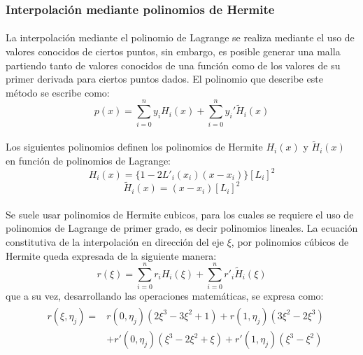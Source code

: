 \documentclass[letterpaper, openright, 12pt]{book}
\begin{document}
    \subsubsection{Interpolación mediante polinomios de Hermite}
    \paragraph*{}
    La interpolación mediante el polinomio de Lagrange se realiza mediante
    el uso de valores conocidos de ciertos puntos, sin embargo, es posible
    generar una malla partiendo tanto de valores conocidos de una función
    como de los valores de su primer derivada para ciertos puntos dados.
    El polinomio que describe este método se escribe como:
    \begin{equation}
    p(x) = \sum_{i = 0}^{n} y_{i}H_{i}(x) + \sum_{i = 0}^{n}y_{i}\prime \widetilde{H}_{i}(x)
    \end{equation}

    \paragraph*{}
    Los siguientes polinomios definen los polinomios de Hermite $H_{i}(x)$
    y $\widetilde{H}_{i}(x)$
    en función de polinomios de Lagrange:
    \begin{equation}
        H_{i}(x) = \{  1 - 2L\prime_{i}(x_{i})(x - x_{i})\}
        \left[L_{i}\right]^2
    \end{equation}
    \begin{equation}
        \widetilde{H}_{i}(x) = (x - x_{i}) \left[L_{i}\right] ^ 2
    \end{equation}

    \paragraph*{}
    Se suele usar polinomios de Hermite cubicos, para los cuales se requiere
    el uso de polinomios de Lagrange de primer grado, es decir polinomios
    lineales. La ecuación constitutiva de la interpolación en dirección del
    eje $\xi$, por polinomios cúbicos de Hermite queda expresada de la
    siguiente manera:
    \begin{equation}
        r(\xi) = \sum_{i = 0}^{n} r_{i}H_{i}(\xi) + \sum_{i = 0}^{n} r\prime_{i}\widetilde{H}_{i}(\xi)
    \end{equation}
    que a su vez, desarrollando las operaciones matemáticas, se expresa como:
    \begin{align}
        &\begin{aligned}
            r(\xi, \eta_{j}) =& r(0, \eta_{j})(2\xi^3 - 3\xi^2 +1) + r(1, \eta_{j})(3\xi^2 - 2\xi^3) \\ &+ r\prime(0, \eta_{j})(\xi^3 - 2\xi^2 + \xi) + r\prime(1, \eta_{j})(\xi^3 - \xi^2)
        \end{aligned}
    \end{align}
\end{document}
